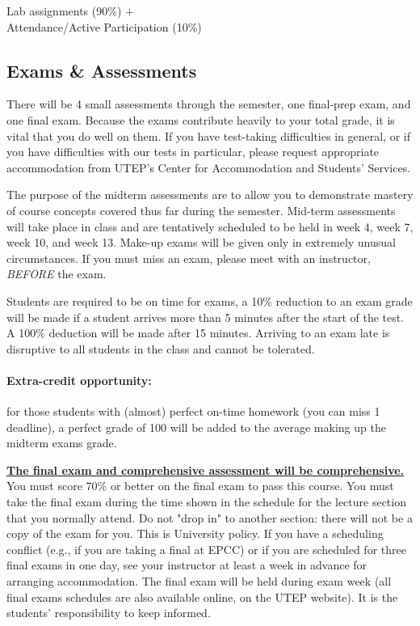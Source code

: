 \documentclass[12pt]{scrartcl}
\begin{document}
\begin{tcolorbox}[colback=blue!5,colframe=blue!75!black,title=Lab Grade]
\begin{center}

Lab assignments (90\%) + \\
Attendance/Active Participation (10\%)
\end{center}

\end{tcolorbox}

\subsection{Exams \& Assessments}
There will be 4 small assessments through the semester, one final-prep exam, and one final exam. 
Because the exams contribute heavily to your total grade, it is vital that you do well on them. 
If you have test-taking difficulties in general, or if you have difficulties with our tests in particular, please request appropriate accommodation from UTEP’s Center for Accommodation and Students’ Services.

The purpose of the midterm assessments are to allow you to demonstrate mastery of course concepts covered thus far during the semester. 
Mid-term assessments will take place 
in class 
and are tentatively scheduled to be held in week 4, week 7, week 10, and week 13. 
Make-up exams will be given only in extremely unusual circumstances. 
If you must miss an exam, please meet with an instructor, \textit{BEFORE} the exam. 

{\color{red}Students are required to be on time for exams, a 10\% reduction to an exam grade will be made if a student arrives more than 5 minutes after the start of the test.
A 100\% deduction will be made after 15 minutes.}
Arriving to an exam late is disruptive to all students in the class and cannot be tolerated. 
 
\paragraph{Extra-credit opportunity:} 
for those students with (almost) perfect on-time homework (you can miss 1 deadline), a perfect grade of 100 will be added to the average making up the midterm exams grade.

\textbf{\underline{The final exam and comprehensive assessment will be comprehensive.}}
You must score 70\% or better on the final exam to pass this course. 
You must take the final exam during the time shown in the schedule for the lecture section that you normally attend. 
Do not "drop in" to another section: there will not be a copy of the exam for you. 
This is University policy. If you have a scheduling conflict (e.g., if you are taking a final at EPCC) or if you are scheduled for three final exams in one day, see your instructor at least a week in advance for arranging accommodation.
 The final exam will be held during exam week (all final exams schedules are also available online, on the UTEP website). 
 It is the students’ responsibility to keep informed.  
 
\end{document}
